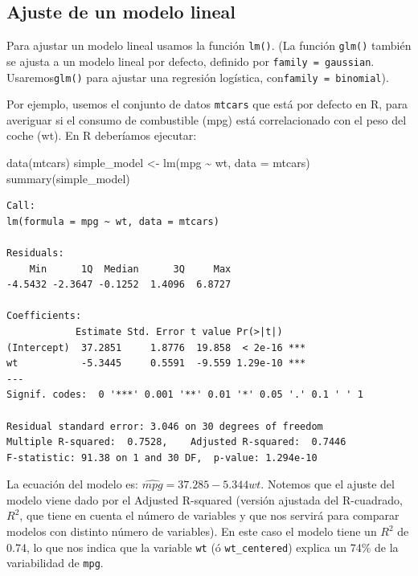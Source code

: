 \documentclass[
]{book}
\newenvironment{Shaded}{\begin{snugshade}}{\end{snugshade}}
\newcommand{\AttributeTok}[1]{\textcolor[rgb]{0.77,0.63,0.00}{#1}}
\newcommand{\FunctionTok}[1]{\textcolor[rgb]{0.00,0.00,0.00}{#1}}
\newcommand{\NormalTok}[1]{#1}
\newcommand{\OtherTok}[1]{\textcolor[rgb]{0.56,0.35,0.01}{#1}}
\newcommand{\SpecialCharTok}[1]{\textcolor[rgb]{0.00,0.00,0.00}{#1}}
\begin{document}
\hypertarget{ajuste-de-un-modelo-lineal}{%
\subsection{Ajuste de un modelo lineal}\label{ajuste-de-un-modelo-lineal}}

Para ajustar un modelo lineal usamos la función \texttt{lm()}. (La función \texttt{glm()} también se ajusta a un modelo lineal por defecto, definido por \texttt{family\ =\ gaussian}. Usaremos\texttt{glm()} para ajustar una regresión logística, con\texttt{family\ =\ binomial}).

Por ejemplo, usemos el conjunto de datos \texttt{mtcars} que está por defecto en R, para averiguar si el consumo de combustible (mpg) está correlacionado con el peso del coche (wt). En R deberíamos ejecutar:

\begin{Shaded}
\begin{Highlighting}[]
\FunctionTok{data}\NormalTok{(mtcars)}
\NormalTok{simple\_model }\OtherTok{\textless{}{-}} \FunctionTok{lm}\NormalTok{(mpg }\SpecialCharTok{\textasciitilde{}}\NormalTok{ wt, }\AttributeTok{data =}\NormalTok{ mtcars)}
\FunctionTok{summary}\NormalTok{(simple\_model)}
\end{Highlighting}
\end{Shaded}

\begin{verbatim}
Call:
lm(formula = mpg ~ wt, data = mtcars)

Residuals:
    Min      1Q  Median      3Q     Max 
-4.5432 -2.3647 -0.1252  1.4096  6.8727 

Coefficients:
            Estimate Std. Error t value Pr(>|t|)    
(Intercept)  37.2851     1.8776  19.858  < 2e-16 ***
wt           -5.3445     0.5591  -9.559 1.29e-10 ***
---
Signif. codes:  0 '***' 0.001 '**' 0.01 '*' 0.05 '.' 0.1 ' ' 1

Residual standard error: 3.046 on 30 degrees of freedom
Multiple R-squared:  0.7528,    Adjusted R-squared:  0.7446 
F-statistic: 91.38 on 1 and 30 DF,  p-value: 1.294e-10
\end{verbatim}

La ecuación del modelo es: \(\widehat {mpg} = 37.285 - 5.344wt\). Notemos que el ajuste del modelo viene dado por el Adjusted R-squared (versión ajustada del R-cuadrado, \(R^2\), que tiene en cuenta el número de variables y que nos servirá para comparar modelos con distinto número de variables). En este caso el modelo tiene un \(R^2\) de 0.74, lo que nos indica que la variable \texttt{wt} (ó \texttt{wt\_centered}) explica un 74\% de la variabilidad de \texttt{mpg}.
\end{document}
